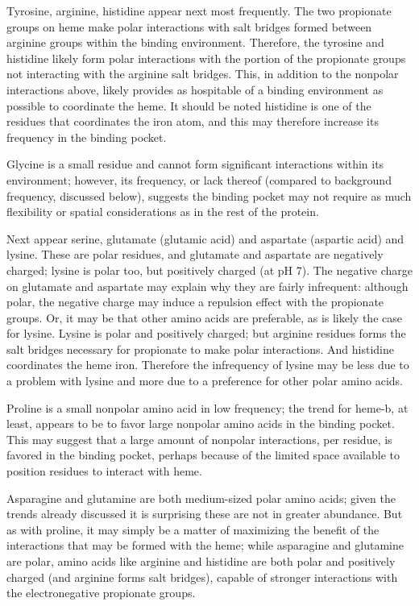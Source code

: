 \documentclass[a4paper, nobind]{templates/ociamthesis}
\begin{document}
Tyrosine, arginine, histidine appear next most frequently. The two propionate groups on heme make polar interactions with salt bridges formed between arginine groups within the binding environment\autocite{Barrows2005}. Therefore, the tyrosine and histidine likely form polar interactions with the portion of the propionate groups not interacting with the arginine salt bridges. This, in addition to the nonpolar interactions above, likely provides as hospitable of a binding environment as possible to coordinate the heme. It should be noted histidine is one of the residues that coordinates the iron atom, and this may therefore increase its frequency in the binding pocket.

Glycine is a small residue and cannot form significant interactions within its environment; however, its frequency, or lack thereof (compared to background frequency, discussed below), suggests the binding pocket may not require as much flexibility or spatial considerations as in the rest of the protein.

Next appear serine, glutamate (glutamic acid) and aspartate (aspartic acid) and lysine. These are polar residues, and glutamate and aspartate are negatively charged; lysine is polar too, but positively charged (at pH 7). The negative charge on glutamate and aspartate may explain why they are fairly infrequent: although polar, the negative charge may induce a repulsion effect with the propionate groups. Or, it may be that other amino acids are preferable, as is likely the case for lysine. Lysine is polar and positively charged; but arginine residues forms the salt bridges necessary for propionate to make polar interactions. And histidine coordinates the heme iron. Therefore the infrequency of lysine may be less due to a problem with lysine and more due to a preference for other polar amino acids.

Proline is a small nonpolar amino acid in low frequency; the trend for heme-b, at least, appears to be to favor large nonpolar amino acids in the binding pocket. This may suggest that a large amount of nonpolar interactions, per residue, is favored in the binding pocket, perhaps because of the limited space available to position residues to interact with heme.

Asparagine and glutamine are both medium-sized polar amino acids; given the trends already discussed it is surprising these are not in greater abundance. But as with proline, it may simply be a matter of maximizing the benefit of the interactions that may be formed with the heme; while asparagine and glutamine are polar, amino acids like arginine and histidine are both polar and positively charged (and arginine forms salt bridges), capable of stronger interactions with the electronegative propionate groups.
\end{document}
